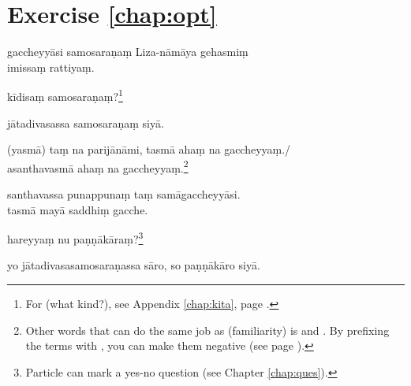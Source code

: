 \section*{Exercise \ref{chap:opt}}
\begin{answerkey}
\item gaccheyy\=asi samosara\d na\d m Liza-n\=am\=aya gehasmi\d m \\imissa\d m rattiya\d m.
\item k\=idisa\d m samosara\d na\d m?\footnote{For  (what kind?), see Appendix \ref{chap:kita}, page \pageref{par:kiidisa}.}
\item j\=atadivasassa samosara\d na\d m siy\=a.
\item (yasm\=a) ta\d m na parij\=an\=ami, tasm\=a aha\d m na gaccheyya\d m./ \\asanthavasm\=a aha\d m na gaccheyya\d m.\footnote{Other words that can do the same job as  (familiarity) is  and . By prefixing the terms with , you can make them negative (see page \pageref{nip:a}).}
\item santhavassa punappuna\d m ta\d m sam\=agaccheyy\=asi. \\tasm\=a may\=a saddhi\d m gacche.
\item hareyya\d m nu pa\d n\d n\=ak\=ara\d m?\footnote{Particle  can mark a yes-no question (see Chapter \ref{chap:ques}).}
\item yo j\=atadivasasamosara\d nassa s\=aro, so pa\d n\d n\=ak\=aro siy\=a.
\end{answerkey}

